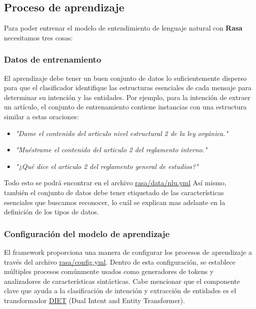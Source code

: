 \subsection{Proceso de aprendizaje}

Para poder entrenar el modelo de entendimiento de lenguaje natural con \textbf{Rasa} necesitamos tres cosas:

\subsubsection{Datos de entrenamiento}

El aprendizaje debe tener un buen conjunto de datos lo suficientemente disperso para que el clasificador identifique las estructuras esenciales de cada mensaje para determinar su intención y las entidades. Por ejemplo, para la intención de extraer un artículo, el conjunto de entrenamiento contiene instancias con una estructura similar a estas oraciones:

\begin{itemize}
    \item \textit{"Dame el contenido del articulo nivel estructural  2 de la ley orgánica."}
    \item \textit{"Muéstrame el contenido del articulo 2 del reglamento interno."}
    \item \textit{"¿Qué dice el articulo 2 del reglamento general de estudios?"}
\end{itemize}

Todo esto se podrá encontrar en el archivo \href{https://github.com/AranGarcia/milo-bot/blob/master/rasa/data/nlu.yml}{rasa/data/nlu.yml} Así mismo, también el conjunto de datos debe tener etiquetado de las características esenciales que buscamos reconocer, lo cuál se explican mas adelante en la definición de los tipos de datos.

\subsubsection{Configuración del modelo de aprendizaje}

El framework proporciona una manera de configurar los procesos de aprendizaje a través del archivo \href{https://github.com/AranGarcia/milo-bot/blob/master/rasa/config.yml}{rasa/config.yml}. Dentro de esta configuración, se establece múltiples procesos comúnmente usados como generadores de tokens y analizadores de características sintácticas. Cabe mencionar que el componente clave que ayuda a la clasificación de intención y extracción de entidades es el transformador \href{https://rasa.com/docs/rasa/components#dietclassifier}{DIET} (Dual Intent and Entity Transformer).

